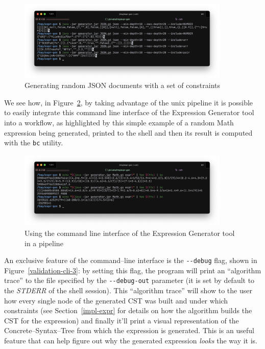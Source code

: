 \documentclass[]{usiinfbachelorproject}
\begin{document}
\begin{figure}[ht]
\centering
\includegraphics[width=0.9\textwidth]{img/validation/cli_step2.png}
\caption{Generating random JSON documents with a set of constraints
}\label{validation-cli-2}
\end{figure}

We see how, in Figure~\ref{validation-cli-4}, by taking advantage of the unix
pipeline it is possible to easily integrate this command line interface of the
Expression Generator tool into a workflow, as highlighted by this simple example
of a random Math expression being generated, printed to the shell and then its
result is computed with the \texttt{bc} utility.

\begin{figure}[ht]
\centering
\includegraphics[width=0.9\textwidth]{img/validation/cli_step4.png}
\caption{Using the command line interface of the Expression Generator tool in
a pipeline
}\label{validation-cli-4}
\end{figure}

An exclusive feature of the command–line interface is the \texttt{-{}-debug}
flag, shown in Figure~\ref{validation-cli-3}: by setting this flag, the program
will print an ``algorithm trace'' to the file specified by the
\texttt{-{}-debug-out} parameter (it is set by default to the \textit{STDERR}
of the shell session).
This ``algorithm trace'' will show to the user how every single node of the
generated CST was built and under which constraints (see Section~\ref{impl-expr}
for details on how the algorithm builds the CST for the expression) and finally
it'll print a visual representation of the Concrete–Syntax–Tree from which the
expression is generated. This is an useful feature that can help figure out
why the generated expression \textit{looks} the way it is.
\end{document}
